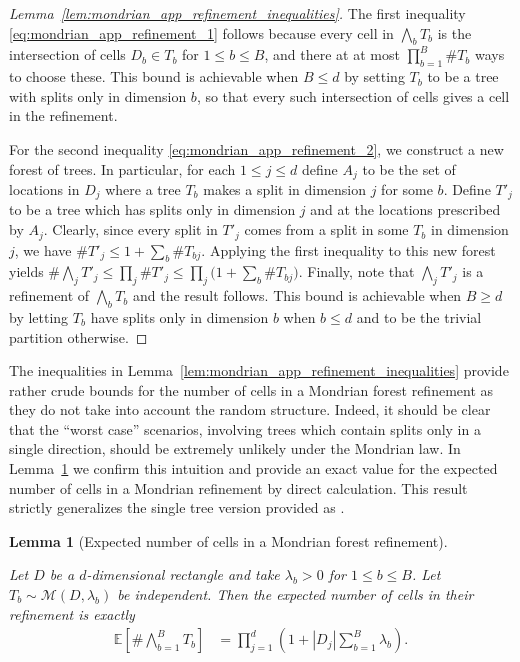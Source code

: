 \documentclass[11pt,lof]{puthesis}
\newcommand{\E}{\ensuremath{\mathbb{E}}}
\newcommand{\cM}{\ensuremath{\mathcal{M}}}
\theoremstyle{break}
\newtheorem{lemma}{Lemma}[section]
\theoremstyle{proof}
\newtheorem{proof}{Proof}
\begin{document}
\begin{proof}[Lemma~\ref{lem:mondrian_app_refinement_inequalities}]

  The first inequality \eqref{eq:mondrian_app_refinement_1}
  follows because every cell in
  $\bigwedge_b T_b$ is the intersection of cells
  $D_b \in T_b$ for $1 \leq b \leq B$, and there at at most
  $\prod_{b=1}^{B} \# T_b$ ways to choose these.
  This bound is achievable when $B \leq d$ by setting
  $T_b$ to be a tree with splits only in dimension $b$,
  so that every such intersection of cells
  gives a cell in the refinement.

  For the second inequality \eqref{eq:mondrian_app_refinement_2},
  we construct a new forest of trees.
  In particular, for each $1 \leq j \leq d$ define
  $A_j$ to be the set of locations in $D_j$ where a tree $T_b$
  makes a split in dimension $j$ for some $b$.
  Define $T'_j$ to be a tree which has splits
  only in dimension $j$ and at the locations prescribed by $A_j$.
  Clearly, since every split in $T'_j$
  comes from a split in some $T_b$ in dimension $j$,
  we have $\# T'_j \leq 1 + \sum_b \# T_{b j}$.
  Applying the first inequality to this new forest yields
  $\# \bigwedge_j T'_j \leq \prod_j \# T'_j
  \leq \prod_j \big( 1 + \sum_b \# T_{b j} \big)$.
  Finally, note that $\bigwedge_j T'_j$
  is a refinement of $\bigwedge_b T_b$ and the result follows.
  This bound is achievable when $B \geq d$ by letting
  $T_b$ have splits only in dimension $b$ when $b \leq d$
  and to be the trivial partition otherwise.
\end{proof}

The inequalities in Lemma~\ref{lem:mondrian_app_refinement_inequalities} provide
rather crude bounds for the number of cells in a Mondrian forest
refinement as they do not take into account the random structure.
Indeed, it should be clear that the ``worst case'' scenarios, involving
trees which contain splits only in a single direction, should be extremely
unlikely under the Mondrian law. In Lemma~\ref{lem:mondrian_app_refinement} we
confirm
this intuition and provide an exact value for the expected number of cells
in a Mondrian refinement by direct calculation. This result strictly generalizes
the single tree version provided as \citet[Proposition~2]{mourtada2020minimax}.

\begin{lemma}[Expected number of cells in a Mondrian forest refinement]
  \label{lem:mondrian_app_refinement}

  Let $D$ be a $d$-dimensional rectangle
  and take $\lambda_b > 0$ for $1 \leq b \leq B$.
  Let $T_b \sim \cM(D, \lambda_b)$ be independent.
  Then the expected number of cells in their refinement is exactly
  \begin{align*}
    \E\left[\# \bigwedge_{b=1}^B T_b \right]
    &= \prod_{j=1}^d \left(
      1 + |D_j| \sum_{b=1}^B \lambda_b
    \right).
  \end{align*}
\end{lemma}
\end{document}

